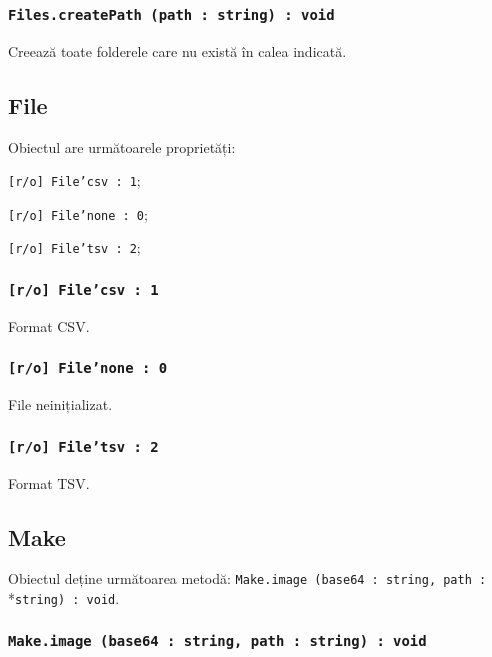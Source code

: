 \subsubsection{\texttt{Files.createPath (path : string) : void}}

Creează toate folderele care nu există în calea indicată.

\subsection{File}

Obiectul \file{} are următoarele proprietăți:
\begin{icItems}
	\item \texttt{[r/o] File'csv : 1};
	\item \texttt{[r/o] File'none : 0};
	\item \texttt{[r/o] File'tsv : 2};
\end{icItems}

\subsubsection{\texttt{[r/o] File'csv : 1}}

Format CSV.

\subsubsection{\texttt{[r/o] File'none : 0}}

File neinițializat.

\subsubsection{\texttt{[r/o] File'tsv : 2}}

Format TSV.

\subsection{Make}

Obiectul \make{} deține următoarea metodă: \texttt{Make.image (base64 : string, path :}\\*\texttt{string) : void}.

\subsubsection{\texttt{Make.image (base64 : string, path : string) : void}}

